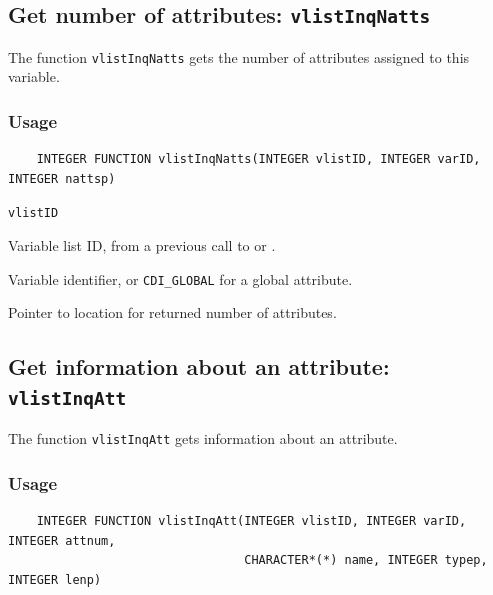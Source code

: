 

\subsection{Get number of attributes: {\tt vlistInqNatts}}
\label{vlistInqNatts}

The function {\tt vlistInqNatts} gets the number of attributes assigned to this variable.

\subsubsection*{Usage}

\begin{verbatim}
    INTEGER FUNCTION vlistInqNatts(INTEGER vlistID, INTEGER varID, INTEGER nattsp)
\end{verbatim}

\hspace*{4mm}\begin{minipage}[]{15cm}
\begin{deflist}{\tt vlistID\ }
\item[{\tt vlistID}]
Variable list ID, from a previous call to {} or {}.
\item[{\tt varID}]
Variable identifier, or {\tt CDI\_GLOBAL} for a global attribute.
\item[{\tt nattsp}]
Pointer to location for returned number of attributes.

\end{deflist}
\end{minipage}


\subsection{Get information about an attribute: {\tt vlistInqAtt}}
\label{vlistInqAtt}

The function {\tt vlistInqAtt} gets information about an attribute.

\subsubsection*{Usage}

\begin{verbatim}
    INTEGER FUNCTION vlistInqAtt(INTEGER vlistID, INTEGER varID, INTEGER attnum, 
                                 CHARACTER*(*) name, INTEGER typep, INTEGER lenp)
\end{verbatim}

